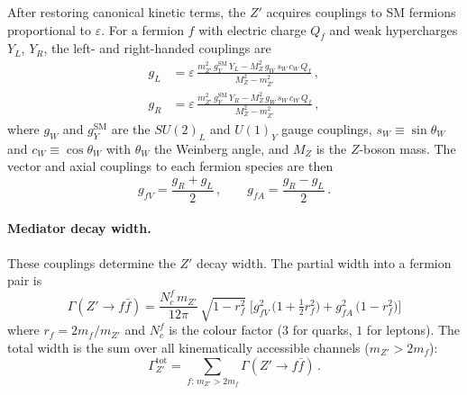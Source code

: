 \documentclass[11pt]{article}
\numberwithin{equation}{section}
\newcommand{\epsX}{\varepsilon}
\begin{document}
After restoring canonical kinetic terms, the $Z'$ acquires couplings to SM fermions proportional to $\epsX$. For a fermion $f$ with electric charge $Q_f$ and weak hypercharges $Y_L$, $Y_R$, the left- and right-handed couplings are~\cite{Berlin:2016gtr}
\begin{align}
    g_L &= \epsX\,\frac{m_{Z'}^2\,g_Y^{\text{SM}}\,Y_L - M_Z^2\,g_W\,s_W\,c_W\,Q_f}{M_Z^2 - m_{Z'}^2}\,, \label{eq:gL} \\
    g_R &= \epsX\,\frac{m_{Z'}^2\,g_Y^{\text{SM}}\,Y_R - M_Z^2\,g_W\,s_W\,c_W\,Q_f}{M_Z^2 - m_{Z'}^2}\,, \label{eq:gR}
\end{align}
where $g_W$ and $g_Y^{\text{SM}}$ are the $SU(2)_L$ and $U(1)_Y$ gauge couplings, $s_W \equiv \sin\theta_W$ and $c_W \equiv \cos\theta_W$ with $\theta_W$ the Weinberg angle, and $M_Z$ is the $Z$-boson mass. The vector and axial couplings to each fermion species are then
\begin{equation}
    g_{fV} = \frac{g_R + g_L}{2}\,, \qquad g_{fA} = \frac{g_R - g_L}{2}\,.
\end{equation}

\paragraph{Mediator decay width.}
These couplings determine the $Z'$ decay width. The partial width into a fermion pair is
\begin{equation}
    \Gamma(Z'\to f\bar{f}) = \frac{N_c^f\,m_{Z'}}{12\pi}\,\sqrt{1 - r_f^2}\;\Big[g_{fV}^2\,\big(1 + \tfrac{1}{2}r_f^2\big) + g_{fA}^2\,\big(1 - r_f^2\big)\Big]
    \label{eq:VP_decay}
\end{equation}
where $r_f = 2m_f/m_{Z'}$ and $N_c^f$ is the colour factor ($3$ for quarks, $1$ for leptons). The total width is the sum over all kinematically accessible channels ($m_{Z'} > 2m_f$):
\begin{equation}
    \Gamma_{Z'}^{\text{tot}} = \sum_{f:\,m_{Z'}>2m_f} \Gamma(Z'\to f\bar{f})\,.
\end{equation}
\end{document}
